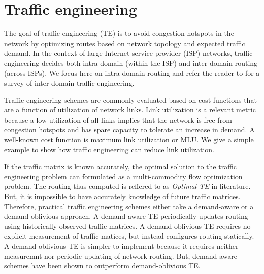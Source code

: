 
\section{Traffic engineering}

The goal of traffic engineering (TE)  is to avoid congestion hotspots in the network by optimizing routes based on network topology and expected traffic demand. In the context of large Internet service provider (ISP) networks, traffic engineering decides both intra-domain (within the ISP) and inter-domain routing (across ISPs). We focus here on intra-domain routing and refer the reader to  \cite{Feamster2003,rexford} for a survey of inter-domain traffic engineering. 


Traffic engineering schemes are commonly evaluated based on cost functions that are a function of utilization of network links. Link utilization is a relevant metric because a low utilization of all links implies that the network is free from congestion hotspots and has spare capacity to tolerate an increase in demand. A well-known cost function is maximum link utilization or MLU. We give a simple example to show how traffic engineering can reduce link utilization.


If the traffic matrix is known accurately, the optimal solution to the traffic engineering problem can formulated as a multi-commodity flow optimization problem. The routing thus computed is reffered to as \emph{Optimal TE} in literature. But, it is impossible to have accurately knowledge of future traffic matrices. Therefore, practical traffic engineering schemes either take a demand-aware or a demand-oblivious approach.  A demand-aware TE periodically updates routing using historically observed traffic matrices. A demand-oblivious TE requires no explicit measurement of traffic matices, but instead configures routing statically. A demand-oblivious TE is simpler to implement because it requires neither measuremnt nor periodic updating of network routing. But, demand-aware schemes have been shown to outperform demand-oblivious TE.

